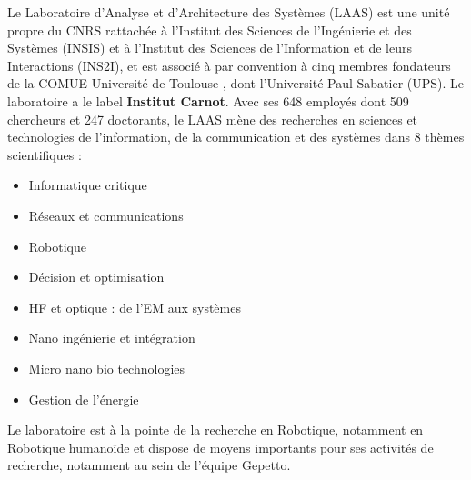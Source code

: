 \documentclass{report}
\begin{document}
Le Laboratoire d’Analyse et d’Architecture des Systèmes (LAAS) est une unité propre du CNRS rattachée à l’Institut des Sciences de l'Ingénierie et des Systèmes (INSIS) et à l'Institut des Sciences de l'Information et de leurs Interactions (INS2I), et est associé à par convention à cinq membres fondateurs de la COMUE \og Université de Toulouse \fg{}, dont l'Université Paul Sabatier (UPS). Le laboratoire a le label \textbf{Institut Carnot}. Avec ses 648 employés dont 509 chercheurs et 247 doctorants, le LAAS mène des recherches en sciences et technologies de l’information, de la communication et des systèmes dans 8 thèmes scientifiques :
\begin{itemize}
\item Informatique critique
\item Réseaux et communications
\item Robotique
\item Décision et optimisation
\item HF et optique : de l'EM aux systèmes
\item Nano ingénierie et intégration
\item Micro nano bio technologies
\item Gestion de l'énergie
\end{itemize}

Le laboratoire est à la pointe de la recherche en Robotique, notamment en Robotique humanoïde et dispose de moyens importants pour ses activités de recherche, notamment au sein de l'équipe Gepetto. 
\end{document}
